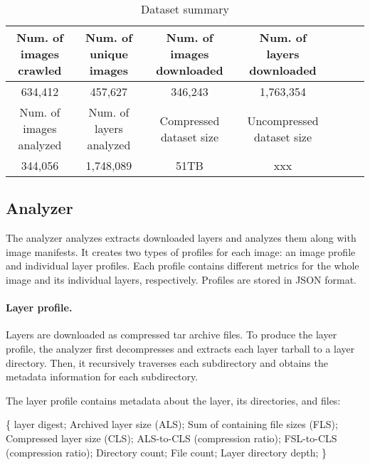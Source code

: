 \begin{table*}
	\centering
	\caption{Dataset summary} \label{tab-dataset-summary}
	\begin{tabular}{c|c|c|c|c|c|c}%
		\hline
		Num. of images crawled & Num. of unique images    & Num. of images downloaded  & Num. of layers downloaded \\
		\hline
		634,412                 & 457,627                 & 346,243                    & 1,763,354  \\
		\hline
		Num. of images analyzed & Num. of layers analyzed & Compressed dataset size              &  Uncompressed dataset size \\
		\hline
		344,056                     & 1,748,089                     & 51TB                        & xxx  \\
		\hline
	\end{tabular}
\end{table*}

\subsection{Analyzer}
\label{sec:analyzer}

The analyzer analyzes extracts downloaded layers
and analyzes them along with image manifests.
It creates two types of profiles for each image:
an image profile and individual layer profiles.
Each profile contains different metrics for the whole image and
its individual layers, respectively.
Profiles are stored in JSON format.


%
%

\paragraph{Layer profile.}

Layers are downloaded as compressed tar archive files.
%
To produce the layer profile, the analyzer first decompresses and extracts each
layer tarball to a layer directory.
%
Then, it recursively traverses each subdirectory and obtains
the metadata information for each subdirectory.

The layer profile contains metadata about the layer, its directories,
and files: 

\{
layer digest; 
Archived layer size (ALS); 
Sum of containing file sizes (FLS); 
Compressed layer size (CLS); 
ALS-to-CLS (compression ratio);
FSL-to-CLS (compression ratio);
Directory count;
File count;
Layer directory depth;
\}

